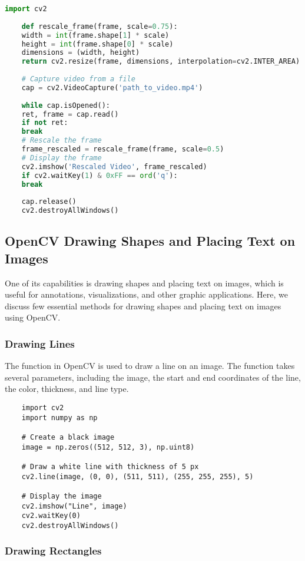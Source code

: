 \begin{lstlisting}[language=Python]
	import cv2
	
	def rescale_frame(frame, scale=0.75):
	width = int(frame.shape[1] * scale)
	height = int(frame.shape[0] * scale)
	dimensions = (width, height)
	return cv2.resize(frame, dimensions, interpolation=cv2.INTER_AREA)
	
	# Capture video from a file
	cap = cv2.VideoCapture('path_to_video.mp4')
	
	while cap.isOpened():
	ret, frame = cap.read()
	if not ret:
	break
	# Rescale the frame
	frame_rescaled = rescale_frame(frame, scale=0.5)
	# Display the frame
	cv2.imshow('Rescaled Video', frame_rescaled)
	if cv2.waitKey(1) & 0xFF == ord('q'):
	break
	
	cap.release()
	cv2.destroyAllWindows()
\end{lstlisting}

\subsection {OpenCV Drawing Shapes and Placing Text on Images}

One of its capabilities is drawing shapes and placing text on images, which is useful for annotations, visualizations, and other graphic applications. Here, we discuss few essential methods for drawing shapes and placing text on images using OpenCV.

\subsubsection{Drawing Lines}

The  function in OpenCV is used to draw a line on an image. The function takes several parameters, including the image, the start and end coordinates of the line, the color, thickness, and line type.\cite{Jasmcaus:2024}

\begin{lstlisting}
	import cv2
	import numpy as np
	
	# Create a black image
	image = np.zeros((512, 512, 3), np.uint8)
	
	# Draw a white line with thickness of 5 px
	cv2.line(image, (0, 0), (511, 511), (255, 255, 255), 5)
	
	# Display the image
	cv2.imshow("Line", image)
	cv2.waitKey(0)
	cv2.destroyAllWindows()
\end{lstlisting}


\subsubsection{Drawing Rectangles}

